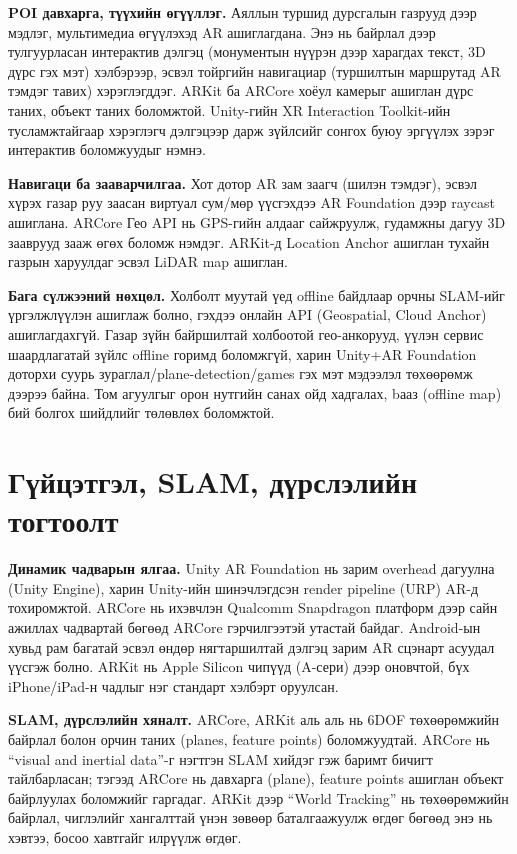 \begin{sloppy}
\textbf{POI давхарга, түүхийн өгүүллэг.} Аяллын туршид дурсгалын газрууд дээр мэдлэг, мультимедиа өгүүлэхэд AR ашиглагдана. Энэ нь байрлал дээр тулгуурласан интерактив дэлгэц (монументын нүүрэн дээр харагдах текст, 3D дүрс гэх мэт) хэлбэрээр, эсвэл тойргийн навигациар (туршилтын маршрутад AR тэмдэг тавих) хэрэглэгддэг. ARKit ба ARCore хоёул камерыг ашиглан дүрс таних, объект таних боломжтой. Unity-гийн XR Interaction Toolkit-ийн тусламжтайгаар хэрэглэгч дэлгэцээр дарж зүйлсийг сонгох буюу эргүүлэх зэрэг интерактив боломжуудыг нэмнэ.

\textbf{Навигаци ба зааварчилгаа.} Хот дотор AR зам заагч (шилэн тэмдэг), эсвэл хүрэх газар руу заасан виртуал сум/мөр үүсгэхдээ AR Foundation дээр raycast ашиглана. ARCore Гео API нь GPS-гийн алдааг сайжруулж, гудамжны дагуу 3D зааврууд зааж өгөх боломж нэмдэг. ARKit-д Location Anchor ашиглан тухайн газрын харуулдаг эсвэл LiDAR map ашиглан.

\textbf{Бага сүлжээний нөхцөл.} Холболт муутай үед offline байдлаар орчны SLAM-ийг үргэлжлүүлэн ашиглаж болно, гэхдээ онлайн API (Geospatial, Cloud Anchor) ашиглагдахгүй. Газар зүйн байршилтай холбоотой гео-анкорууд, үүлэн сервис шаардлагатай зүйлс offline горимд боломжгүй, харин Unity+AR Foundation доторхи суурь зураглал/plane-detection/games гэх мэт мэдээлэл төхөөрөмж дээрээ байна. Том агуулгыг орон нутгийн санах ойд хадгалах, bааз (offline map) бий болгох шийдлийг төлөвлөх боломжтой.

\section*{Гүйцэтгэл, SLAM, дүрслэлийн тогтоолт}

\textbf{Динамик чадварын ялгаа.} Unity AR Foundation нь зарим overhead дагуулна (Unity Engine), харин Unity-ийн шинэчлэгдсэн render pipeline (URP) AR-д тохиромжтой. ARCore нь ихэвчлэн Qualcomm Snapdragon платформ дээр сайн ажиллах чадвартай бөгөөд ARCore гэрчилгээтэй утастай байдаг. Android-ын хувьд рам багатай эсвэл өндөр нягтаршилтай дэлгэц зарим AR сцэнарт асуудал үүсгэж болно. ARKit нь Apple Silicon чипүүд (A-сери) дээр оновчтой, бүх iPhone/iPad-н чадлыг нэг стандарт хэлбэрт оруулсан.

\textbf{SLAM, дүрслэлийн хяналт.} ARCore, ARKit аль аль нь 6DOF төхөөрөмжийн байрлал болон орчин таних (planes, feature points) боломжуудтай. ARCore нь ``visual and inertial data''-г нэгтгэн SLAM хийдэг гэж баримт бичигт тайлбарласан; тэгээд ARCore нь давхарга (plane), feature points ашиглан объект байрлуулах боломжийг гаргадаг. ARKit дээр ``World Tracking'' нь төхөөрөмжийн байрлал, чиглэлийг хангалттай үнэн зөвөөр баталгаажуулж өгдөг бөгөөд энэ нь хэвтээ, босоо хавтгайг илрүүлж өгдөг.


\end{sloppy}
